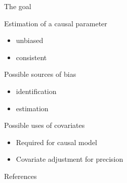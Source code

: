\documentclass[xcolor={table}]{beamer}
\begin{document}

\begin{frame}{The goal}

\begin{wideitemize}
\item Estimation of a causal parameter\pause
\begin{itemize}
\item unbiased\pause
\item consistent\pause
\end{itemize}
\item Possible sources of bias\pause
\begin{itemize}
\item identification
\item estimation\pause
\end{itemize}
\item Possible uses of covariates\pause
\begin{itemize}
\item Required for causal model
\item Covariate adjustment for precision 
\end{itemize}
\end{wideitemize}

\end{frame}





\backupbegin

\nocite{schuler2017targeted,chernozhukov2018double}
\begin{frame}[allowframebreaks]{References}
    
    
\end{frame}
\backupend
\end{document}
